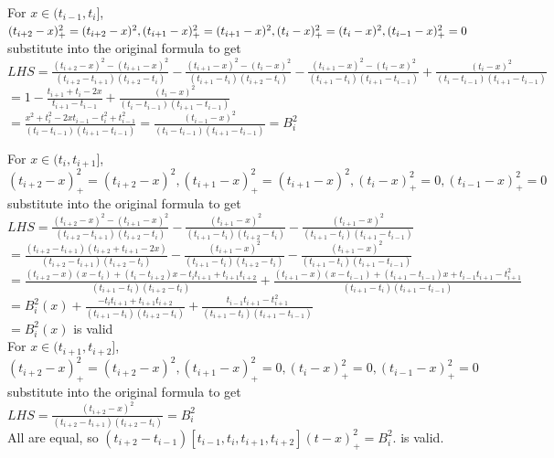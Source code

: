 \documentclass[a4paper]{article}
\begin{document}
For $x \in (t_{i-1},t_i]$, $(t_{i+2} - x)_+^2=(t_{i+2} - x)^2,(t_{i+1} - x)_+^2=(t_{i+1} - x)^2\\
,(t_{i} - x)_+^2=(t_{i} - x)^2,(t_{i-1} - x)_+^2=0$ substitute into the original formula to get\\
$LHS=\frac{(t_{i+2} - x)^2-(t_{i+1} - x)^2}{(t_{i+2}-t_{i+1})(t_{i+2}-t_i)}-\frac{(t_{i+1} - x)^2-(t_{i} - x)^2}{(t_{i+1}-t_{i})(t_{i+2}-t_i)}-\frac{(t_{i+1} - x)^2-(t_{i} - x)^2}{(t_{i+1}-t_{i})(t_{i+1}-t_{i-1})}+\frac{(t_{i} - x)^2}{(t_{i}-t_{i-1})(t_{i+1}-t_{i-1})}$\\
$=1-\frac{t_{i+1}+t_{i}-2x}{t_{i+1}-t_{i-1}}+\frac{(t_{i} - x)^2}{(t_{i}-t_{i-1})(t_{i+1}-t_{i-1})}$\\
$=\frac{x^2+t_i^2-2xt_{i-1}-t_i^2+t_{i-1}^2}{(t_{i}-t_{i-1})(t_{i+1}-t_{i-1})}=\frac{(t_{i-1} - x)^2}{(t_{i}-t_{i-1})(t_{i+1}-t_{i-1})}=B_i^2$

For $x \in (t_{i},t_{i+1}]$, $(t_{i+2} - x)_+^2=(t_{i+2} - x)^2,(t_{i+1} - x)_+^2=(t_{i+1} - x)^2,(t_{i} - x)_+^2=0,(t_{i-1} - x)_+^2=0$ substitute into the original formula to get\\
$LHS=\frac{(t_{i+2} - x)^2-(t_{i+1} - x)^2}{(t_{i+2}-t_{i+1})(t_{i+2}-t_i)}-\frac{(t_{i+1} - x)^2}{(t_{i+1}-t_{i})(t_{i+2}-t_i)}-\frac{(t_{i+1} - x)^2}{(t_{i+1}-t_{i})(t_{i+1}-t_{i-1})}$\\
$=\frac{(t_{i+2} -t_{i+1}) (t_{i+2} +t_{i+1}- 2x)}{(t_{i+2}-t_{i+1})(t_{i+2}-t_i)}-\frac{(t_{i+1} - x)^2}{(t_{i+1}-t_{i})(t_{i+2}-t_i)}-\frac{(t_{i+1} - x)^2}{(t_{i+1}-t_{i})(t_{i+1}-t_{i-1})}$\\
$=\frac{(t_{i+2}-x)(x-t_i)+(t_i-t_{i+2})x-t_it_{i+1}+t_{i+1}t_{i+2}}{(t_{i+1}-t_{i})(t_{i+2}-t_i)}+\frac{(t_{i+1}-x)(x-t_{i-1})+(t_{i+1}-t_{i-1})x+t_{i-1}t_{i+1}-t_{i+1}^2}{(t_{i+1}-t_{i})(t_{i+1}-t_{i-1})}$\\
$=B_i^2(x)+\frac{-t_it_{i+1}+t_{i+1}t_{i+2}}{(t_{i+1}-t_{i})(t_{i+2}-t_i)}+\frac{t_{i-1}t_{i+1}-t_{i+1}^2}{(t_{i+1}-t_{i})(t_{i+1}-t_{i-1})}$\\
$=B_i^2(x)$ is valid\\
For $x \in (t_{i+1},t_{i+2}]$, $(t_{i+2} - x)_+^2=(t_{i+2} - x)^2,(t_{i+1} - x)_+^2=0,(t_{i} - x)_+^2=0,(t_{i-1} - x)_+^2=0$ substitute into the original formula to get\\
$LHS=\frac{(t_{i+2} - x)^2}{(t_{i+2}-t_{i+1})(t_{i+2}-t_i)}=B_i^2$\\
All are equal, so $(t_{i+2} - t_{i-1})[t_{i-1}, t_i, t_{i+1}, t_{i+2}](t - x)_+^2 = B_i^2.$ is valid.\\
\end{document}
